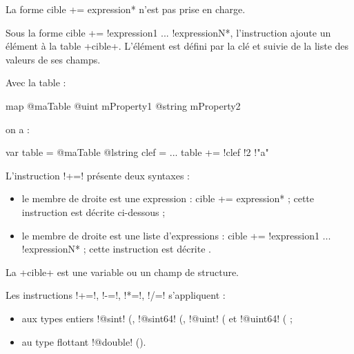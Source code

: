
La forme \ggs*cible += expression* n'est pas prise en charge.

Sous la forme \ggs*cible += !expression1 ... !expressionN*, l'instruction ajoute un élément à la table \ggs+cible+. L'élément est défini par la clé et suivie de la liste des valeurs de ses champs.


Avec la table :
\begin{galgas}
map @maTable {
  @uint mProperty1
  @string mProperty2
}
\end{galgas}

on a :

\begin{galgas}
var table = @maTable {}
@lstring clef = ...
table += !clef !2 !"a"
\end{galgas}















L'instruction \ggs!+=! présente deux syntaxes :
\begin{itemize}
  \item le membre de droite est une expression : \ggs*cible += expression* ; cette instruction est décrite ci-dessous ;
  \item le membre de droite est une liste d'expressions : \ggs*cible += !expression1 ... !expressionN* ; cette instruction est décrite .
\end{itemize}

La \ggs+cible+ est une variable ou un champ de structure.

Les instructions \ggs!+=!, \ggs!-=!, \ggs!*=!, \ggs!/=! s'appliquent :
\begin{itemize}
 \item aux types entiers \ggs!@sint! (, \ggs!@sint64! (, \ggs!@uint! ( et \ggs!@uint64! ( ;
 \item au type flottant \ggs!@double! ().
\end{itemize}

